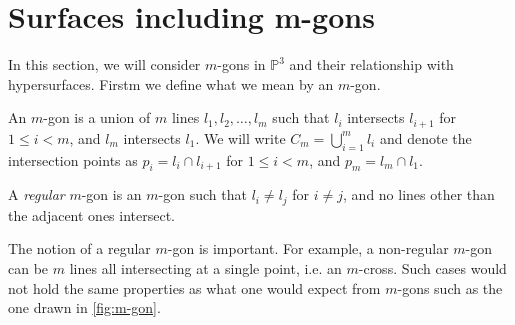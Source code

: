 \section{Surfaces including m-gons}

In this section, we will consider $m$-gons in $\mathbb{P}^3$ and their relationship with hypersurfaces. Firstm we define what we mean by an $m$-gon.
\begin{definition}
    An $m$-gon is a union of $m$ lines $l_1, l_2, \dots, l_m$ such that $l_i$ intersects $l_{i+1}$ for $1 \leq i < m$, and $l_m$ intersects $l_1$. We will write $C_m = \bigcup_{i=1}^m l_i$ and denote the intersection points as $p_i = l_i \cap l_{i+1}$ for $1 \leq i < m$, and $p_m = l_m \cap l_1$.
\end{definition}

\begin{definition}
    A \emph{regular} $m$-gon is an $m$-gon such that $l_i \neq l_j$ for $i \neq j$, and no lines other than the adjacent ones intersect.
\end{definition}

The notion of a regular $m$-gon is important. For example, a non-regular $m$-gon can be $m$ lines all intersecting at a single point, i.e. an $m$-cross. Such cases would not hold the same properties as what one would expect from $m$-gons such as the one drawn in \cref{fig:m-gon}. 


